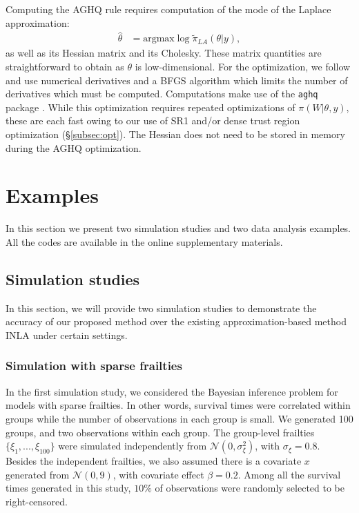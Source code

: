 \documentclass[ba]{imsart}
\begin{document}
Computing the AGHQ rule requires computation of the mode of the Laplace approximation:
\begin{equation}\begin{aligned}
\widehat{\theta} &= \text{argmax}\log\widetilde{\pi}_{LA}(\theta|y),
\end{aligned}\end{equation}
as well as its Hessian matrix and its Cholesky. These matrix quantities are straightforward to obtain as $\theta$ is low-dimensional. For the optimization, we follow \citet{inla} and use numerical derivatives and a BFGS algorithm which limits the number of derivatives which must be computed. Computations make use of the \texttt{aghq} package \citep{stringeraghqpackage}. While this optimization requires repeated optimizations of $\pi(W|\theta,y)$, these are each fast owing to our use of SR1 and/or dense trust region optimization (\S\ref{subsec:opt}). The Hessian does not need to be stored in memory during the AGHQ optimization.

\section{Examples}\label{sec:example}

In this section we present two simulation studies and two data analysis examples. All the codes are available in the online supplementary materials.

\subsection{Simulation studies}\label{subsec:sim}
In this section, we will provide two simulation studies to demonstrate the accuracy of our proposed method over the existing approximation-based method INLA under certain settings.

\subsubsection{Simulation with sparse frailties}\label{subsubsec:sim1}

In the first simulation study, we considered the Bayesian inference problem for models with sparse frailties. In other words, survival times were correlated within groups while the number of observations in each group is small. We generated 100 groups, and two observations within each group. The group-level frailties $\{\xi_1,...,\xi_{100}\}$ were simulated independently from $\mathcal{N}(0,\sigma_\xi^2)$, with $\sigma_{\xi} = 0.8$. Besides the independent frailties, we also assumed there is a covariate $x$ generated from $\mathcal{N}(0,9)$, with covariate effect $\beta = 0.2$. Among all the survival times generated in this study, $10\%$ of observations were randomly selected to be right-censored.
\end{document}
